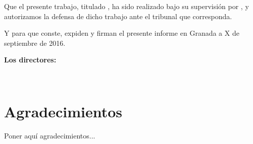 \vspace{0.5cm}

Que el presente trabajo, titulado \textit{\textbf{\myTitle}},
ha sido realizado bajo su supervisión por \textbf{\myName}, y autorizamos la defensa de dicho trabajo ante el tribunal
que corresponda.

\vspace{0.5cm}

Y para que conste, expiden y firman el presente informe en Granada a X de septiembre de 2016.

\vspace{1cm}

\textbf{Los directores:}

\vspace{5cm}

\noindent \textbf{\myProf \ \ \ \ \ \myOtherProf}

\chapter*{Agradecimientos}
\thispagestyle{empty}

       \vspace{1cm}


Poner aquí agradecimientos...

